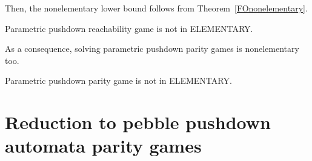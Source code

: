 Then, the nonelementary lower bound follows from Theorem~\ref{FOnonelementary}. 


\begin{theorem}

{\sc Parametric pushdown reachability game} is not in {\sf ELEMENTARY}.

\end{theorem}

As a consequence, %
solving parametric pushdown parity games
is 
 nonelementary too.

\begin{corollary}

{\sc Parametric pushdown parity game} is not in {\sf ELEMENTARY}.

\end{corollary}

\section{%
Reduction to pebble pushdown automata parity games
}\label{pebbles}






